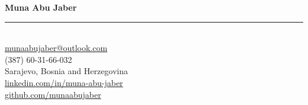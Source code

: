 \begin{center}
    {\LARGE \textbf{Muna Abu Jaber}} \\
    \rule{\textwidth}{0.4pt} \\%
    \vspace{5pt}
    \href{mailto:munaabujaber@outlook.com}{munaabujaber@outlook.com} \\
    (387) 60-31-66-032 \\
    Sarajevo, Bosnia and Herzegovina \\
    \href{https://www.linkedin.com/in/muna-abu-jaber/}{linkedin.com/in/muna-abu-jaber} \\
    \href{https://github.com/munaabujaber}{github.com/munaabujaber}
    \vspace{15pt}
\end{center}
